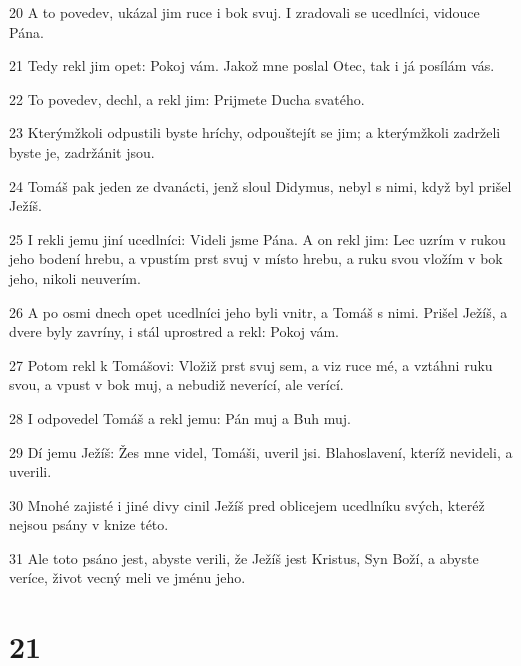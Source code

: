 \par 20 A to povedev, ukázal jim ruce i bok svuj. I zradovali se ucedlníci, vidouce Pána.
\par 21 Tedy rekl jim opet: Pokoj vám. Jakož mne poslal Otec, tak i já posílám vás.
\par 22 To povedev, dechl, a rekl jim: Prijmete Ducha svatého.
\par 23 Kterýmžkoli odpustili byste hríchy, odpouštejít se jim; a kterýmžkoli zadrželi byste je, zadržánit jsou.
\par 24 Tomáš pak jeden ze dvanácti, jenž sloul Didymus, nebyl s nimi, když byl prišel Ježíš.
\par 25 I rekli jemu jiní ucedlníci: Videli jsme Pána. A on rekl jim: Lec uzrím v rukou jeho bodení hrebu, a vpustím prst svuj v místo hrebu, a ruku svou vložím v bok jeho, nikoli neuverím.
\par 26 A po osmi dnech opet ucedlníci jeho byli vnitr, a Tomáš s nimi. Prišel Ježíš, a dvere byly zavríny, i stál uprostred a rekl: Pokoj vám.
\par 27 Potom rekl k Tomášovi: Vložiž prst svuj sem, a viz ruce mé, a vztáhni ruku svou, a vpust v bok muj, a nebudiž neverící, ale verící.
\par 28 I odpovedel Tomáš a rekl jemu: Pán muj a Buh muj.
\par 29 Dí jemu Ježíš: Žes mne videl, Tomáši, uveril jsi. Blahoslavení, kteríž nevideli, a uverili.
\par 30 Mnohé zajisté i jiné divy cinil Ježíš pred oblicejem ucedlníku svých, kteréž nejsou psány v knize této.
\par 31 Ale toto psáno jest, abyste verili, že Ježíš jest Kristus, Syn Boží, a abyste veríce, život vecný meli ve jménu jeho.

\chapter{21}

